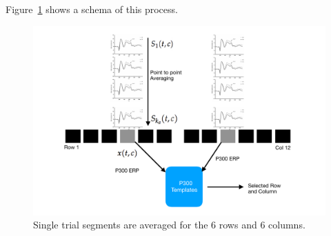 \documentclass[entropy,article,submit,moreauthors,pdftex,10pt,a4paper]{mdpi}
\begin{document}
\begin{enumerate}

\end{enumerate}

Figure~\ref{fig:classification} shows a schema of this process. 
\begin{figure}
\centering
\includegraphics[width=15cm]{classificationgraph2.pdf}
\caption{Single trial segments are averaged for the 6 rows and 6 columns.}
\label{fig:classification}
\end{figure}

\end{document}
